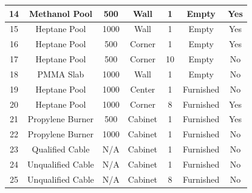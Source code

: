 \begin{table}[h!]
\begin{center}
\begin{tabular}{|c|c|c|c|c|c|c|}
14      & Methanol Pool     &     500       & Wall          & 1                 & Empty                 &        Yes \\ \hline
15      & Heptane Pool      &    1000       & Wall          & 1                 & Empty                 &        Yes \\ \hline
16      & Heptane Pool      &    500       & Corner        & 1                 & Empty                 &        Yes \\ \hline
17      & Heptane Pool      &    500       & Corner        & 10                & Empty                 &         No \\ \hline
18      &  PMMA Slab        &    1000       & Wall          & 1                 & Empty                 &         No \\ \hline
19      & Heptane Pool      &    1000       & Center        & 1                 & Furnished             &         No \\ \hline
20      & Heptane Pool      &    1000       & Corner        & 8                 & Furnished             &        Yes \\ \hline
21      & Propylene Burner  &     500       & Cabinet       & 1                 & Furnished             &        Yes \\ \hline
22      & Propylene Burner  &    1000       & Cabinet       & 1                 & Furnished             &         No \\ \hline
23      & Qualified Cable   &        N/A    & Cabinet       & 1                 & Furnished             &         No \\ \hline
24      & Unqualified Cable &        N/A    & Cabinet       & 1                 & Furnished             &         No \\ \hline
25      & Unqualified Cable &        N/A    & Cabinet       & 8                 & Furnished             &         No \\ \hline
\end{tabular}
\end{center}
\label{FM_SNL_Matrix}
\end{table}


